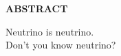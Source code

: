 
%
%

\begin{center}
	{\LARGE\bfseries ABSTRACT}
\end{center}
\vs\hs Neutrino is neutrino.\\
Don't you know neutrino?
\thispagestyle{empty}
\clearpage
